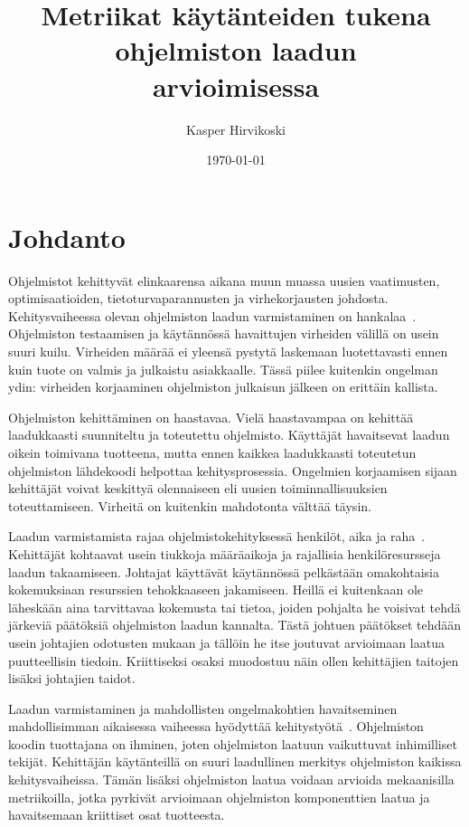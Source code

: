 \documentclass[finnish]{../tktltiki2}
\title{Metriikat käytänteiden tukena ohjelmiston laadun\\arvioimisessa}
\author{Kasper Hirvikoski}
\date{\today}
\theoremstyle{definition}
\theoremstyle{remark}
\begin{document}

\maketitle

\tableofcontents
\newpage


\section{Johdanto}

Ohjelmistot kehittyvät elinkaarensa aikana muun muassa uusien vaatimusten, optimisaatioiden, tietoturvaparannusten ja 
virhekorjausten johdosta. Kehitysvaiheessa olevan ohjelmiston laadun varmistaminen on 
hankalaa~\cite{NB05, NB07, ZN08, MNDT09}. Ohjelmiston testaamisen ja käytännössä havaittujen virheiden välillä on usein 
suuri kuilu. Virheiden määrää ei yleensä pystytä laskemaan luotettavasti ennen kuin tuote on valmis ja julkaistu 
asiakkaalle. Tässä piilee kuitenkin ongelman ydin: virheiden korjaaminen ohjelmiston julkaisun jälkeen on erittäin 
kallista.

    Ohjelmiston kehittäminen on haastavaa. Vielä haastavampaa on kehittää laadukkaasti suunniteltu ja toteutettu 
ohjelmisto. Käyttäjät havaitsevat laadun oikein toimivana tuotteena, mutta ennen kaikkea laadukkaasti toteutetun 
ohjelmiston lähdekoodi helpottaa kehitysprosessia. Ongelmien korjaamisen sijaan kehittäjät voivat keskittyä olennaiseen 
eli uusien toiminnallisuuksien toteuttamiseen. Virheitä on kuitenkin mahdotonta välttää täysin.

    Laadun varmistamista rajaa ohjelmistokehityksessä henkilöt, aika ja raha~\cite{ZN08}. Kehittäjät kohtaavat usein 
tiukkoja määräaikoja ja rajallisia henkilöresursseja laadun takaamiseen. Johtajat käyttävät käytännössä pelkästään 
omakohtaisia kokemuksiaan resurssien tehokkaaseen jakamiseen. Heillä ei kuitenkaan ole läheskään aina tarvittavaa 
kokemusta tai tietoa, joiden pohjalta he voisivat tehdä järkeviä päätöksiä ohjelmiston laadun kannalta. Tästä johtuen 
päätökset tehdään usein johtajien odotusten mukaan ja tällöin he itse joutuvat arvioimaan laatua puutteellisin tiedoin. 
Kriittiseksi osaksi muodostuu näin ollen kehittäjien taitojen lisäksi johtajien taidot.

    Laadun varmistaminen ja mahdollisten ongelmakohtien havaitseminen mahdollisimman aikaisessa vaiheessa hyödyttää 
kehitystyötä~\cite{NB05}. Ohjelmiston koodin tuottajana on ihminen, joten ohjelmiston laatuun vaikuttuvat inhimilliset 
tekijät. Kehittäjän käytänteillä on suuri laadullinen merkitys ohjelmiston kaikissa kehitysvaiheissa. Tämän lisäksi 
ohjelmiston laatua voidaan arvioida mekaanisilla metriikoilla, jotka pyrkivät arvioimaan ohjelmiston komponenttien 
laatua ja havaitsemaan kriittiset osat tuotteesta.
\end{document}
